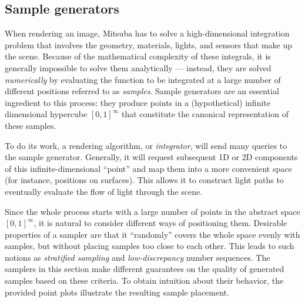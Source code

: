 \newpage
\subsection{Sample generators}
\label{sec:samplers}
When rendering an image, Mitsuba has to solve a high-dimensional integration problem that involves the
geometry, materials, lights, and sensors that make up the scene. Because of the mathematical complexity
of these integrals, it is generally impossible to solve them analytically --- instead, they
are solved \emph{numerically} by evaluating the function to be integrated at a large number of
different positions referred to as \emph{samples}. Sample generators are an essential ingredient to this
process: they produce points in a (hypothetical) infinite dimensional hypercube $[0,1]^{\infty}$ that
constitute the canonical representation of these samples.

To do its work, a rendering algorithm, or \emph{integrator}, will send many queries to the sample generator.
Generally, it will request subsequent 1D or 2D components of this infinite-dimensional ``point'' and map
them into a more convenient space (for instance,  positions on surfaces). This allows it to construct
light paths to eventually evaluate the flow of light through the scene.

Since the whole process starts with a large number of points in the abstract space $[0,1]^{\infty}$,
it is natural to consider different ways of positioning them. Desirable properties of a sampler are
that it ``randomly'' covers the whole space evenly with samples, but without placing samples too close
to each other. This leads to such notions as \emph{stratified sampling} and \emph{low-discrepancy}
number sequences. The samplers in this section make different guarantees on the quality of generated
samples based on these criteria. To obtain intuition about their behavior, the provided point plots
illustrate the resulting sample placement.
